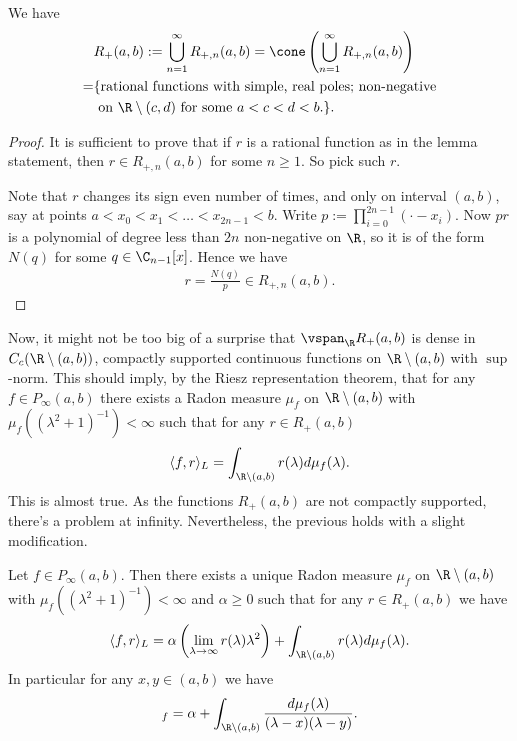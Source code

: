 \begin{lem}
	We have
	\begin{align*}
		&R_{+}(a, b) := \bigcup_{n = 1}^{\infty} R_{+, n}(a, b) = \cone\left( \bigcup_{n = 1}^{\infty} R_{+, n}(a, b)\right) \\
		= &\{ \text{rational functions with simple, real poles; non-negative} \\
		& \text{ on $\R \setminus (c, d)$ for some $a < c < d < b$.} \}.
	\end{align*}
\end{lem}
\begin{proof}
	It is sufficient to prove that if $r$ is a rational function as in the lemma statement, then $r \in R_{+, n}(a, b)$ for some $n \geq 1$. So pick such $r$.

	Note that $r$ changes its sign even number of times, and only on interval $(a, b)$, say at points $a < x_{0} < x_{1} < \ldots < x_{2 n - 1} < b$. Write $p := \prod_{i = 0}^{2 n - 1} (\cdot - x_{i})$. Now $p r$ is a polynomial of degree less than $2 n$ non-negative on $\R$, so it is of the form $N(q)$ for some $q \in \C_{n - 1}[x]$. Hence we have
	\begin{align*}
		r = \frac{N(q)}{p} \in R_{+, n}(a, b).
	\end{align*}
\end{proof}

Now, it might not be too big of a surprise that $\vspan_{\R} R_{+}(a, b)$ is dense in $C_{c}(\R \setminus (a, b))$, compactly supported continuous functions on $\R \setminus (a, b)$ with $\sup$-norm. This should imply, by the Riesz representation theorem, that for any $f \in P_{\infty}(a, b)$ there exists a Radon measure $\mu_{f}$ on $\R \setminus (a, b)$ with $\mu_{f}((\lambda^2 + 1)^{-1}) < \infty$ such that for any $r \in R_{+}(a, b)$
\begin{align*}
	\langle f, r \rangle_{L} = \int_{\R \setminus (a, b)} r(\lambda) d \mu_{f}(\lambda).
\end{align*}
This is almost true. As the functions $R_{+}(a, b)$ are not compactly supported, there's a problem at infinity.  Nevertheless, the previous holds with a slight modification.

\begin{lause}\label{integral_loewner}
	Let $f \in P_{\infty}(a, b)$. Then there exists a unique Radon measure $\mu_{f}$ on $\R \setminus (a, b)$ with $\mu_{f}((\lambda^2 + 1)^{-1}) < \infty$ and $\alpha \geq 0$ such that for any $r \in R_{+}(a, b)$ we have
	\begin{align*}
		\langle f, r \rangle_{L} = \alpha \left(\lim_{\lambda \to \infty} r(\lambda) \lambda^2 \right) + \int_{\R \setminus (a, b)} r(\lambda) d \mu_{f}(\lambda).
	\end{align*}
	In particular for any $x,y \in (a, b)$ we have
	\begin{align*}
		[x, y]_{f} = \alpha + \int_{\R \setminus (a, b)} \frac{d \mu_{f}(\lambda)}{(\lambda - x) (\lambda - y)}.
	\end{align*}
\end{lause}

